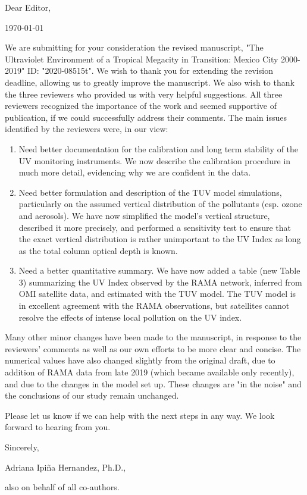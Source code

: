 \documentclass[12pt]{article}
\begin{document}
\begin{minipage}{0.5\linewidth}
    Dear Editor,
\end{minipage}
\begin{minipage}{0.5\linewidth}
    \begin{flushright}
        \today
    \end{flushright}
\end{minipage}

We are submitting for your consideration the revised manuscript, "The Ultraviolet Environment of a Tropical Megacity in Transition: Mexico City 2000-2019" ID: "2020-08515t".  We wish to thank you for extending the revision deadline, allowing us to greatly improve the manuscript.  We also wish to thank the three reviewers who provided us with very helpful suggestions.  All three reviewers recognized the importance of the work and seemed supportive of publication, if we could successfully address their comments.  The main issues identified by the reviewers were, in our view:
\begin{enumerate}
    \item Need better documentation for the calibration and long term stability of the UV monitoring instruments.  We now describe the calibration procedure in much more detail, evidencing why we are confident in the data.
    \item Need better formulation and description of the TUV model simulations, particularly on the assumed vertical distribution of the pollutants (esp. ozone and aerosols).  We have now simplified the model's vertical structure, described it more precisely, and performed a sensitivity test to ensure that the exact vertical distribution is rather unimportant to the UV Index as long as the total column optical depth is known.
    \item Need a better quantitative summary.  We have now added a table (new Table 3) summarizing the UV Index observed by the RAMA network, inferred from OMI satellite data, and estimated with the TUV model.  The TUV model is in excellent agreement with the RAMA observations, but satellites cannot resolve the effects of intense local pollution on the UV index.
\end{enumerate}
Many other minor changes have been made to the manuscript, in response to the reviewers' comments as well as our own efforts to be more clear and concise.  The numerical values have also changed slightly from the original draft, due to addition of RAMA data from late 2019 (which became available only recently), and due to the changes in the model set up.  These changes are "in the noise" and the conclusions of our study remain unchanged.

Please let us know if we can help with the next steps in any way.  We look forward to hearing from you.

Sincerely,

Adriana Ipiña Hernandez, Ph.D.,

also on behalf of all co-authors.
\end{document}
